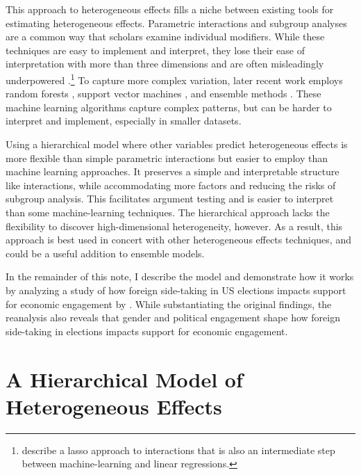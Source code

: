 \documentclass[12pt]{article}
\begin{document}
This approach to heterogeneous effects fills a niche between existing tools for estimating heterogeneous effects.
Parametric interactions and subgroup analyses are a common way that scholars examine individual modifiers. 
While these techniques are easy to implement and interpret, they lose their ease of interpretation with more than three dimensions and are often misleadingly underpowered \citep{Simmonsetal2011}.\footnote{\citet{BlackwellOlson2022} describe a lasso approach to interactions that is also an intermediate step between machine-learning and linear regressions.}
To capture more complex variation, later recent work employs random forests \citep{GreenKern2012, WagerAthey2018}, support vector machines \citep{ImaiRatkovic2013}, and ensemble methods \citep{Grimmeretal2017, Kuenzeletal2019, Dorieetal2022}.
These machine learning algorithms capture complex patterns, but can be harder to interpret and implement, especially in smaller datasets. 

 
 
Using a hierarchical model where other variables predict heterogeneous effects is more flexible than simple parametric interactions but easier to employ than machine learning approaches.  
It preserves a simple and interpretable structure like interactions, while accommodating more factors and reducing the risks of subgroup analysis. 
This facilitates argument testing and is easier to interpret than some machine-learning techniques.
The hierarchical approach lacks the flexibility to discover high-dimensional heterogeneity, however.  
As a result, this approach is best used in concert with other heterogeneous effects techniques, and could be a useful addition to ensemble models. 


In the remainder of this note, I describe the model and demonstrate how it works by analyzing a study of how foreign side-taking in US elections impacts support for economic engagement by \citet{BushPrather2020}.  
While substantiating the original findings, the reanalysis also reveals that gender and political engagement shape how foreign side-taking in elections impacts support for economic engagement.



\section{A Hierarchical Model of Heterogeneous Effects}
\end{document}
